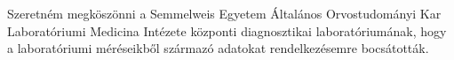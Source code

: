 \chapter*{\koszonetnyilvanitas}

Szeretném megköszönni a Semmelweis Egyetem Általános Orvostudományi Kar Laboratóriumi Medicina Intézete központi diagnosztikai laboratóriumának, hogy a laboratóriumi méréseikből származó adatokat rendelkezésemre bocsátották.